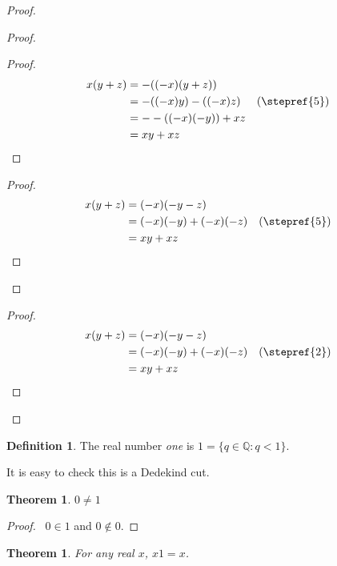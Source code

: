 \documentclass{article}
\let\qed\relax
\newtheorem{theorem}[axiom]{Theorem}
\theoremstyle{definition}
\newtheorem{definition}[axiom]{Definition}
\begin{document}
\begin{proof}
\begin{proof}
\begin{proof}
                \pf
                \begin{align*}
                    x(y+z) & = -((-x)(y+z)) \\
                    & = -((-x)y)- ((-x)z) & (\text{\stepref{5}}) \\
                    & = --((-x)(-y)) + xz \\
                    & = xy + xz
                \end{align*}
            \end{proof}
            \begin{proof}
                \pf
                \begin{align*}
                    x(y+z) & = (-x)(-y-z) \\
                    & = (-x)(-y)+(-x)(-z) & (\text{\stepref{5}}) \\
                    & = xy + xz
                \end{align*}
            \end{proof}
        \end{proof}
        \begin{proof}
            \pf
            \begin{align*}
                x(y+z) & = (-x)(-y-z) \\
                & = (-x)(-y) + (-x)(-z) & (\text{\stepref{2}}) \\
                & = xy + xz
            \end{align*}
        \end{proof}
        \qed
    \end{proof}

    \begin{definition}
        The real number \emph{one} is $1 = \{ q \in \mathbb{Q} : q < 1 \}$.

        It is easy to check this is a Dedekind cut.
    \end{definition}

    \begin{theorem}
        $0 \neq 1$
    \end{theorem}

    \begin{proof}
        \pf\ $0 \in 1$ and $0 \notin 0$. \qed
    \end{proof}

    \begin{theorem}
        For any real $x$, $x1 = x$.
    \end{theorem}
\end{document}
